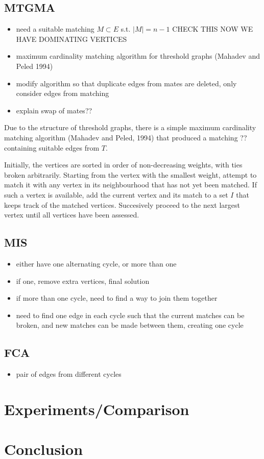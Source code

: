 \documentclass{llncs}
\begin{document}
\subsection{MTGMA}
\begin{itemize}
	\item need a suitable matching $M\subset E$ s.t. $|M| = n-1$ CHECK THIS NOW WE HAVE DOMINATING VERTICES
	\item maximum cardinality matching algorithm for threshold graphs (Mahadev and Peled 1994)
	\item modify algorithm so that duplicate edges from mates are deleted, only consider edges from matching
	\item explain swap of mates??
\end{itemize}
Due to the structure of threshold graphs, there is a simple maximum cardinality matching algorithm (Mahadev and Peled, 1994) that produced a matching ?? containing suitable edges from $T$.

Initially, the vertices are sorted in order of non-decreasing weights, with ties broken arbitrarily. Starting from the vertex with the smallest weight, attempt to match it with any vertex in its neighbourhood that has not yet been matched. If such a vertex is available, add the current vertex and its match to a set $I$ that keeps track of the matched vertices. Succesively proceed to the next largest vertex until all vertices have been assessed.



\subsection{MIS}
\begin{itemize}
	\item either have one alternating cycle, or more than one
	\item if one, remove extra vertices, final solution
	\item if more than one cycle, need to find a way to join them together
	\item need to find one edge in each cycle such that the current matches can be broken, and new matches can be made between them, creating one cycle
\end{itemize}

\subsection{FCA}
\begin{itemize}
	\item pair of edges from different cycles
\end{itemize}







\section{Experiments/Comparison}

\section{Conclusion}
\end{document}
